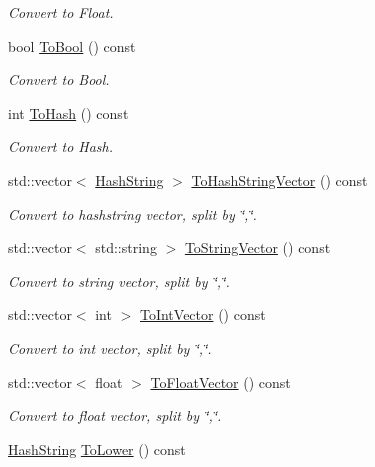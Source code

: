 \begin{DoxyCompactItemize}
\begin{DoxyCompactList}\small\item\em Convert to Float. \end{DoxyCompactList}\item 
bool \hyperlink{classHashString_a2c6efc21be678b95400d39f1d7fa5e2d}{To\+Bool} () const 
\begin{DoxyCompactList}\small\item\em Convert to Bool. \end{DoxyCompactList}\item 
int \hyperlink{classHashString_aeab96d9a0754cd88ab236bf96475c393}{To\+Hash} () const 
\begin{DoxyCompactList}\small\item\em Convert to Hash. \end{DoxyCompactList}\item 
std\+::vector$<$ \hyperlink{classHashString}{Hash\+String} $>$ \hyperlink{classHashString_aa4eccfa433a7eaf8e1e4c7c1203be26f}{To\+Hash\+String\+Vector} () const 
\begin{DoxyCompactList}\small\item\em Convert to hashstring vector, split by \char`\"{},\char`\"{}. \end{DoxyCompactList}\item 
std\+::vector$<$ std\+::string $>$ \hyperlink{classHashString_a29c4db981e55a5a50160641246a236c5}{To\+String\+Vector} () const 
\begin{DoxyCompactList}\small\item\em Convert to string vector, split by \char`\"{},\char`\"{}. \end{DoxyCompactList}\item 
std\+::vector$<$ int $>$ \hyperlink{classHashString_a028786d3b02a7ff7acdb6b0ee8c686a6}{To\+Int\+Vector} () const 
\begin{DoxyCompactList}\small\item\em Convert to int vector, split by \char`\"{},\char`\"{}. \end{DoxyCompactList}\item 
std\+::vector$<$ float $>$ \hyperlink{classHashString_a4e9614dfb532f0edcc3b0b3f957ae706}{To\+Float\+Vector} () const 
\begin{DoxyCompactList}\small\item\em Convert to float vector, split by \char`\"{},\char`\"{}. \end{DoxyCompactList}\item 
\hyperlink{classHashString}{Hash\+String} \hyperlink{classHashString_a5445f120cef3f39a7316880efb7aebed}{To\+Lower} () const 

\end{DoxyCompactItemize}
